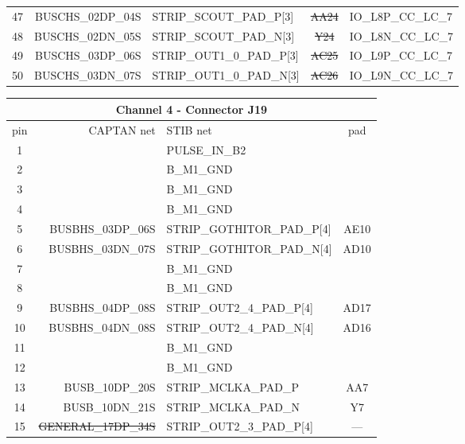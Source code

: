 \documentclass[11pt]{article}
\begin{document}
\begin{table}
\begin{center}
\begin{tabular}{|c|r|l|c|l|}
47 & BUSCHS\_02DP\_04S & STRIP\_SCOUT\_PAD\_P[3]    & \sout{AA24} & IO\_L8P\_CC\_LC\_7 \\
48 & BUSCHS\_02DN\_05S & STRIP\_SCOUT\_PAD\_N[3]    & \sout{Y24} & IO\_L8N\_CC\_LC\_7 \\  \hline
49 & BUSCHS\_03DP\_06S & STRIP\_OUT1\_0\_PAD\_P[3]   & \sout{AC25} & IO\_L9P\_CC\_LC\_7 \\
50 & BUSCHS\_03DN\_07S & STRIP\_OUT1\_0\_PAD\_N[3]   & \sout{AC26} & IO\_L9N\_CC\_LC\_7 \\ \hline
\end{tabular}
\end{center}
\end{table}


\begin{table}
\begin{center}
\scriptsize
\begin{tabular}{|c|r|l|c|} \hline
\multicolumn{4}{|c|}{Channel 4 - Connector J19} \\ \hline
pin & CAPTAN net & STIB net & pad \\ \hline\hline
 1 &                 &  PULSE\_IN\_B2             &      \\
 2 &                 &  B\_M1\_GND                &      \\ \hline
 3 &                 &  B\_M1\_GND                &      \\
 4 &                 &  B\_M1\_GND                &      \\ \hline
 5 & BUSBHS\_03DP\_06S &  STRIP\_GOTHITOR\_PAD\_P[4] & AE10 \\
 6 & BUSBHS\_03DN\_07S &  STRIP\_GOTHITOR\_PAD\_N[4] & AD10 \\ \hline
 7 &                 &  B\_M1\_GND                &      \\
 8 &                 &  B\_M1\_GND                &      \\ \hline
 9 & BUSBHS\_04DP\_08S &  STRIP\_OUT2\_4\_PAD\_P[4]   & AD17 \\
10 & BUSBHS\_04DN\_08S &  STRIP\_OUT2\_4\_PAD\_N[4]   & AD16 \\ \hline
11 &                 &  B\_M1\_GND                &      \\
12 &                 &  B\_M1\_GND                &      \\ \hline
13 &   BUSB\_10DP\_20S &  STRIP\_MCLKA\_PAD\_P       & AA7  \\
14 &   BUSB\_10DN\_21S &  STRIP\_MCLKA\_PAD\_N       & Y7   \\ \hline
15 &\sout{GENERAL\_17DP\_34S} &  STRIP\_OUT2\_3\_PAD\_P[4]   & ---  \\

\end{tabular}
\end{center}
\end{table}
\end{document}
